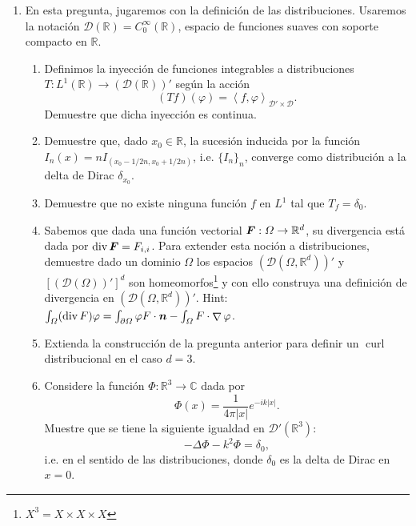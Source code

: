 \documentclass{article}
\renewcommand{\vec}{\vectorsym}
\DeclareMathOperator{\grad}{\nabla}
\DeclareMathOperator{\dive}{\text{div}}
\DeclareMathOperator{\curl}{\text{curl}}
\newcommand{\R}{\mathbb{R}}
\newcommand{\pts}[1]{[{\bf #1 puntos}] }
\begin{document}
\begin{enumerate}
    \item En esta pregunta, jugaremos con la definición de las distribuciones. Usaremos la notación $\mathcal D(\R) = C_0^\infty(\R)$, espacio de funciones suaves con soporte compacto en $\R$.
        \begin{enumerate}
            \item\pts{1} Definimos la inyección de funciones integrables a distribuciones $T:L^1(\R) \to \left(\mathcal D(\R)\right)'$ según la acción
                $$ (Tf)(\varphi)  = \left\langle f, \varphi\right\rangle_{\mathcal D'\times \mathcal D}.$$
                Demuestre que dicha inyección es continua. 
            \item\pts{1} Demuestre que, dado $x_0\in \R$,  la sucesión inducida por la función $I_n(x) = nI_{(x_0-1/2n, x_0+1/2n)}$, i.e. $\{I_n\}_n$, converge como distribución a la delta de Dirac $\delta_{x_0}$. 
            \item\pts{1}Demuestre que no existe ninguna función $f$ en $L^1$ tal que $T_f = \delta_0$. 
            \item\pts{2} Sabemos que dada una función vectorial $\vec F:\Omega \to \R^d$, su divergencia está dada por $\dive{\vec F}=F_{i,i}$. Para extender esta noción a distribuciones, demuestre dado un dominio $\Omega$ los espacios $(\mathcal D(\Omega, \R^d))'$ y $[(\mathcal D(\Omega))']^d$ son homeomorfos\footnote{$X^3 = X\times X\times X$} y con ello construya una definición de divergencia en $(\mathcal D(\Omega, \R^d))'$. Hint: $\int_\Omega (\dive F)\varphi = \int_{\partial\Omega} \varphi F\cdot \vec n - \int_\Omega F\cdot \grad \varphi$. 
            \item\pts{1} Extienda la construcción de la pregunta anterior para definir un $\curl$ distribucional en el caso $d=3$. 
            \item\pts{2} Considere la función $\Phi:\R^3\to \mathbb C$ dada por
                    $$ \Phi(x) = \frac{1}{4\pi|x|} e^{-ik |x|}. $$
                Muestre que se tiene la siguiente igualdad en $\mathcal D'(\R^3)$:
                        $$ -\Delta \Phi - k^2 \Phi = \delta_0, $$
                i.e. en el sentido de las distribuciones, donde $\delta_0$ es la delta de Dirac en $x=0$. 
        \end{enumerate}
\end{enumerate}

\end{document}
